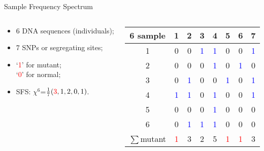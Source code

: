 \documentclass[handout]{beamer}
\begin{document}
\begin{frame}{Sample Frequency Spectrum}
\begin{columns}
\begin{column}{0.4\textwidth}
\begin{itemize}
\item 6 DNA sequences (individuals);
\item 7 SNPs or segregating sites;
\item `\textcolor{red}{1}' for mutant;\\ `\textcolor{red}{0}' for normal;
\item SFS: $\chi^{6}$=$\frac{1}{7}(\textcolor{red}{3},1,2,0,1)$.
\end{itemize}
\end{column}
\begin{column}{0.6\textwidth}
\begin{center}
\begin{tabular}{|c|c c c c c c c|}
\hline
6 sample & 1 & 2 & 3 & 4 & 5 & 6 & 7 \\ [0.5ex] 
\hline \hline
1 & 0 & 0 & \textcolor{blue}{1} & \textcolor{blue}{1} & 0 & 0 & \textcolor{blue}{1} \\ 
\hline
2 & 0 & 0 & 0 & \textcolor{blue}{1} & 0 & \textcolor{blue}{1} & 0 \\ 
\hline
3 & 0 & \textcolor{blue}{1} & 0 & 0 & \textcolor{blue}{1} & 0 & \textcolor{blue}{1} \\ 
\hline
4 & \textcolor{blue}{1} & \textcolor{blue}{1} & 0 & \textcolor{blue}{1} & 0 & 0 & \textcolor{blue}{1} \\ 
\hline
5 & 0 & 0 & 0 & \textcolor{blue}{1} & 0 & 0 & 0 \\ 
\hline
6 & 0 & \textcolor{blue}{1} & \textcolor{blue}{1} & \textcolor{blue}{1} & 0 & 0 & 0 \\
\hline \hline
$\sum$mutant & \textcolor{red}{1} & 3 & 2 & 5 & \textcolor{red}{1} & \textcolor{red}{1} & 3\\
\hline
\end{tabular}
\end{center}
\end{column}
\end{columns}
\end{frame}
\end{document}
